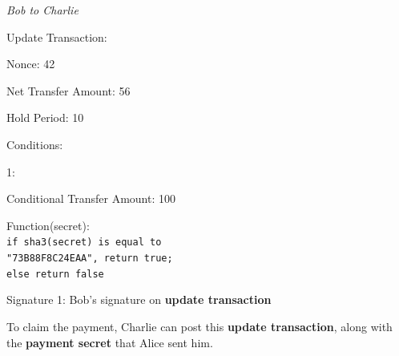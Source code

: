 \documentclass[a4paper]{article}
\newcommand{\bgls}[1]{\textbf{\gls{#1}}}
\newenvironment{mydescription}
{\begin{description}
\setlength{\itemsep}{5pt}
  \setlength{\parskip}{0pt}
  \setlength{\labelsep}{5pt}
}{
\end{description}}
\begin{document}
\begin{mdframed}[style=message]{\emph{Bob to Charlie}}
\begin{mydescription}
\item[Update Transaction:] \hfill
\begin{mydescription}
  \item[Nonce:] 42
  \item[Net Transfer Amount:] 56
  \item[Hold Period:] 10
  \item[Conditions:] \hfill
  \begin{mydescription}
    \item[1:] \hfill
    \begin{mydescription}
      \item[Conditional Transfer Amount:] 100
      \item[Function(secret):] \texttt{\\ if sha3(secret) is equal to\\ "73B88F8C24EAA", return true;\\ else return false}
    \end{mydescription}
  \end{mydescription}
\end{mydescription}
\item[Signature 1:] Bob's signature on \bgls{update transaction}
\end{mydescription}
\end{mdframed}

To claim the payment, Charlie can post this \bgls{update transaction}, along with the \bgls{payment secret} that Alice sent him.
\end{document}
